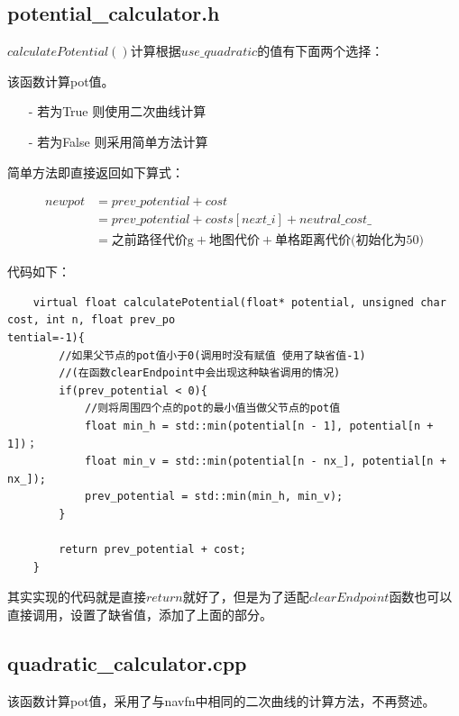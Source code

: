 \documentclass[9pt, oneside]{book}
\begin{document}
\subsection{potential\_calculator.h}

$calculatePotential()$计算根据$use\_quadratic$的值有下面两个选择：

该函数计算pot值。

\begin{itemize}
    \item [-] 若为True  则使用二次曲线计算
    \item [-] 若为False 则采用简单方法计算
\end{itemize}

简单方法即直接返回如下算式： 

\begin{equation}
    \begin{aligned}
        new pot &= prev\_potential + cost\\
                &= prev\_potential + costs[next\_i] + neutral\_cost\_\\
                &= \mbox{之前路径代价g} + \mbox{地图代价} + \mbox{单格距离代价(初始化为50)}
    \end{aligned}
\end{equation}

代码如下：

\small
\begin{verbatim}
    virtual float calculatePotential(float* potential, unsigned char cost, int n, float prev_po
tential=-1){
        //如果父节点的pot值小于0(调用时没有赋值 使用了缺省值-1)
        //(在函数clearEndpoint中会出现这种缺省调用的情况)
        if(prev_potential < 0){
            //则将周围四个点的pot的最小值当做父节点的pot值
            float min_h = std::min(potential[n - 1], potential[n + 1])；
            float min_v = std::min(potential[n - nx_], potential[n + nx_]);
            prev_potential = std::min(min_h, min_v);
        }

        return prev_potential + cost;
    }
\end{verbatim}
\normalsize

其实实现的代码就是直接$return$就好了，但是为了适配$clearEndpoint$函数也可以直接调用，设置了缺省值，添加了上面的部分。

\subsection{quadratic\_calculator.cpp}

该函数计算pot值，采用了与navfn中相同的二次曲线的计算方法，不再赘述。
\end{document}
